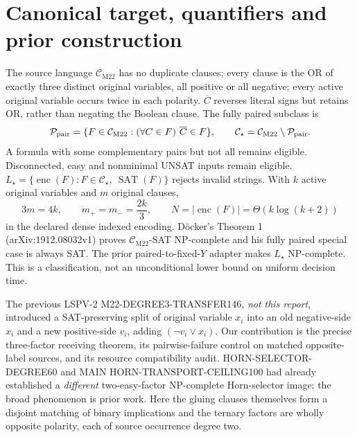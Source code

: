\documentclass[11pt]{article}
\newcommand{\CM}{\mathcal C_{\mathrm{M22}}}
\newcommand{\CS}{\mathcal C_{\star}}
\newcommand{\SAT}{\operatorname{SAT}}
\begin{document}
\section{Canonical target, quantifiers and prior construction}
The source language $\CM$ has no duplicate clauses; every clause is the OR of exactly three distinct original variables, all positive or all negative; every active original variable occurs twice in each polarity. $\overline C$ reverses literal signs but retains OR, rather than negating the Boolean clause. The fully paired subclass is
\[
\mathcal P_{\rm pair}=\{F\in\CM:(\forall C\in F)\ \overline C\in F\},\qquad
\CS=\CM\setminus\mathcal P_{\rm pair}.
\]
A formula with some complementary pairs but not all remains eligible. Disconnected, easy and nonminimal UNSAT inputs remain eligible. $L_\star=\{\operatorname{enc}(F):F\in\CS,\ \SAT(F)\}$ rejects invalid strings. With $k$ active original variables and $m$ original clauses,
\[
3m=4k,\qquad m_+=m_-=\frac{2k}{3},\qquad N=|\operatorname{enc}(F)|=\Theta(k\log(k+2))
\]
in the declared dense indexed encoding. D\"ocker's Theorem 1 (arXiv:1912.08032v1) proves $\CM$-SAT NP-complete and his fully paired special case is always SAT. The prior paired-to-fixed-$Y$ adapter makes $L_\star$ NP-complete. This is a classification, not an unconditional lower bound on uniform decision time.

The previous LSPV-2 M22-DEGREE3-TRANSFER146, \emph{not this report}, introduced a SAT-preserving split of original variable $x_i$ into an old negative-side $x_i$ and a new positive-side $v_i$, adding $(\neg v_i\vee x_i)$. Our contribution is the precise three-factor receiving theorem, its pairwise-failure control on matched opposite-label sources, and its resource compatibility audit. HORN-SELECTOR-DEGREE60 and MAIN HORN-TRANSPORT-CEILING100 had already established a \emph{different} two-easy-factor NP-complete Horn-selector image; the broad phenomenon is prior work. Here the gluing clauses themselves form a disjoint matching of binary implications and the ternary factors are wholly opposite polarity, each of source occurrence degree two.
\end{document}
